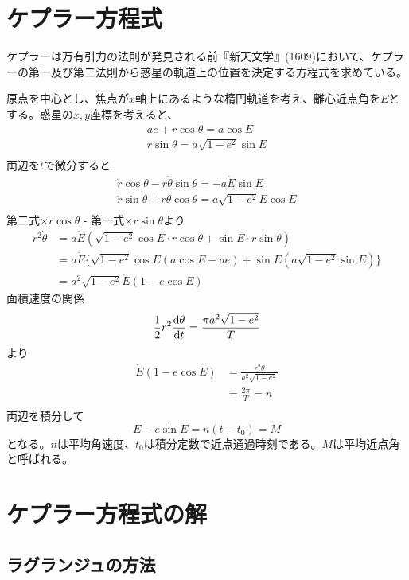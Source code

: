 
\section{ケプラー方程式}
	ケプラーは万有引力の法則が発見される前『新天文学』(1609)において、ケプラーの第一及び第二法則から惑星の軌道上の位置を決定する方程式を求めている。

	原点を中心とし、焦点が$x$軸上にあるような楕円軌道を考え、離心近点角を$E$とする。惑星の$x, y$座標を考えると、
	\begin{gather*}
		ae + r\cos\theta = a\cos E\\
		r\sin\theta = a\sqrt{1-e^2}\sin E\\
	\end{gather*}
	両辺を$t$で微分すると
	\begin{gather*}
		\dot{r}\cos\theta - r\dot{\theta}\sin\theta = - a\dot{E}\sin E\\
		\dot{r}\sin\theta + r\dot{\theta}\cos\theta = a\sqrt{1-e^2}\dot{E}\cos E\\
	\end{gather*}
	第二式$\times r\cos\theta$ - 第一式$\times r\sin\theta$より
	\begin{align*}
		r^2\dot{\theta}
        &= a\dot{E}( \sqrt{1-e^2}\cos E \cdot r\cos\theta + \sin E \cdot r\sin\theta)\\
		&= a\dot{E}\{ \sqrt{1-e^2}\cos E (a\cos E - ae) + \sin E (a\sqrt{1-e^2}\sin E) \}\\
		&= a^2\sqrt{1-e^2}\dot{E}(1 - e\cos E)
	\end{align*}
	面積速度の関係
        \[\frac{1}{2}r^2\de[\theta]{t} = \frac{\pi a^2\sqrt{1-e^2}}{T}\]
    より
    \begin{align*}
		\dot{E}(1 - e\cos E)
        &= \frac{r^2\dot{\theta}}{a^2\sqrt{1 - e^2}}\\
        &= \frac{2\pi}{T} = n\\
	\end{align*}
	両辺を積分して
		\[E - e\sin E = n(t - t_0) = M\]
	となる。$n$は平均角速度、$t_0$は積分定数で近点通過時刻である。$M$は平均近点角と呼ばれる。

\section{ケプラー方程式の解}
    \subsection{ラグランジュの方法}
